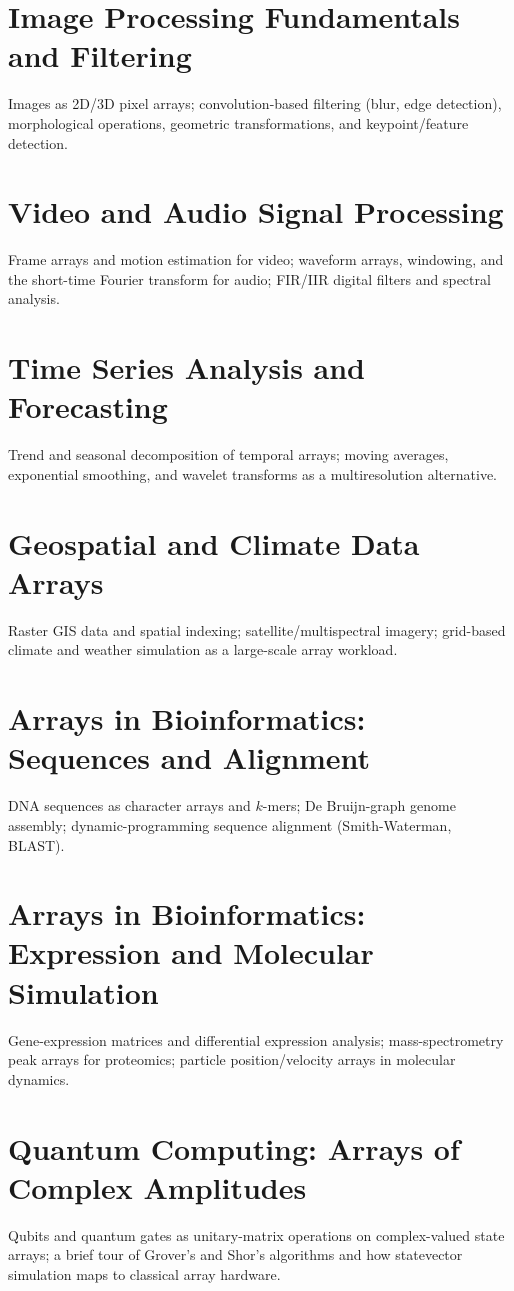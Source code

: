 \chapter{Image Processing Fundamentals and Filtering}
Images as 2D/3D pixel arrays; convolution-based filtering (blur, edge detection), morphological operations, geometric transformations, and keypoint/feature detection.

\chapter{Video and Audio Signal Processing}
Frame arrays and motion estimation for video; waveform arrays, windowing, and the short-time Fourier transform for audio; FIR/IIR digital filters and spectral analysis.

\chapter{Time Series Analysis and Forecasting}
Trend and seasonal decomposition of temporal arrays; moving averages, exponential smoothing, and wavelet transforms as a multiresolution alternative.

\chapter{Geospatial and Climate Data Arrays}
Raster GIS data and spatial indexing; satellite/multispectral imagery; grid-based climate and weather simulation as a large-scale array workload.

\chapter{Arrays in Bioinformatics: Sequences and Alignment}
DNA sequences as character arrays and $k$-mers; De Bruijn-graph genome assembly; dynamic-programming sequence alignment (Smith-Waterman, BLAST).

\chapter{Arrays in Bioinformatics: Expression and Molecular Simulation}
Gene-expression matrices and differential expression analysis; mass-spectrometry peak arrays for proteomics; particle position/velocity arrays in molecular dynamics.

\chapter{Quantum Computing: Arrays of Complex Amplitudes}
Qubits and quantum gates as unitary-matrix operations on complex-valued state arrays; a brief tour of Grover's and Shor's algorithms and how statevector simulation maps to classical array hardware.

